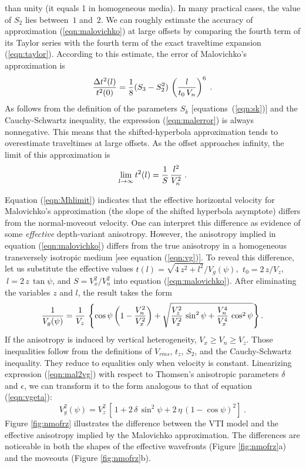 than unity (it equals 1 in homogeneous media). In many 
practical cases, the value of $S_2$ lies between~$1$ and~$2$.  We can
roughly estimate the accuracy of approximation (\ref{eqn:malovichko}) at
large offsets by comparing the fourth term of its Taylor series with
the fourth term of the exact traveltime expansion (\ref{eqn:taylor}).
According to this estimate, the error of Malovichko's approximation is
\begin{equation}
{{\Delta t^2(l)} \over t^2(0)} = {1 \over 8} (S_3-S_2^2)\,
\left({l \over {t_0\,V_n}}\right)^6\;.
\label{eqn:malerror}
\end{equation}
As follows from the definition of the parameters $S_k$ 
[equations~(\ref{eqn:sk})] and the Cauchy-Schwartz inequality, the expression
(\ref{eqn:malerror}) is always nonnegative. 
This means that the shifted-hyperbola approximation
tends to overestimate traveltimes at large offsets. As the offset
approaches infinity, the limit of this approximation is 
\begin{equation}
\lim_{l \rightarrow \infty} t^2(l) = {1 \over S}\,{l^2 \over V_n^2}\;.
\label{eqn:Mhlimit}
\end{equation}
\par
Equation (\ref{eqn:Mhlimit}) indicates that the effective horizontal
velocity for Malovichko's approximation (the slope of the shifted
hyperbola asymptote) differs from the normal-moveout velocity. One 
can interpret this difference as evidence of some \emph{effective}
depth-variant anisotropy. However, the anisotropy implied in
equation (\ref{eqn:malovichko}) differs from the true anisotropy in a 
homogeneous transversely isotropic medium [see equation (\ref{eqn:vg})]. 
To reveal this difference, let us substitute
the effective values $t(l) = {\sqrt{4\,z^2 + l^2} / {V_g(\psi)}}$,
$~t_0 = {2\,z / V_z}$, $~l = 2\,z\,\tan{\psi}$, and $S = {V_x^2 / V_n^2}$ 
into equation (\ref{eqn:malovichko}). After eliminating the
variables $z$ and $l$, the result takes the form
\begin{equation}
{1 \over {V_g(\psi)}} = {1 \over V_z}\,\left\{
\cos{\psi}\left(1 - {V_n^2 \over V_x^2}\right) +
\sqrt{{V_z^2 \over V_x^2}\,\sin^2{\psi} +
{V_n^4 \over V_x^4}\,\cos^2{\psi}}\right\}.
\label{eqn:mal2vg}
\end{equation}
If the anisotropy is induced by vertical heterogeneity, $V_x \ge V_n \ge V_z$.  
Those inequalities follow from the definitions of $V_{rms}$, $t_z$,
$S_2$, and the Cauchy-Schwartz inequality. They reduce to equalities only
when velocity is constant.  Linearizing expression
(\ref{eqn:mal2vg}) with respect to Thomsen's anisotropic parameters $\delta$
and $\epsilon$, we can transform it to the form analogous to
that of equation (\ref{eqn:vgeta}):
\begin{equation}
V_g^2(\psi) = V_z^2\,\left[\,1 + 2\,\delta\,\sin^2{\psi} + 
2\,\eta\,(1 - \cos{\psi})^2\right]\;.
\label{eqn:vgvz}
\end{equation}
Figure \ref{fig:nmofrz} illustrates the difference between the VTI
model and the effective anisotropy implied by the Malovichko approximation. 
The differences are noticeable in both the shapes of the effective wavefronts
(Figure \ref{fig:nmofrz}a) and the moveouts (Figure \ref{fig:nmofrz}b).

